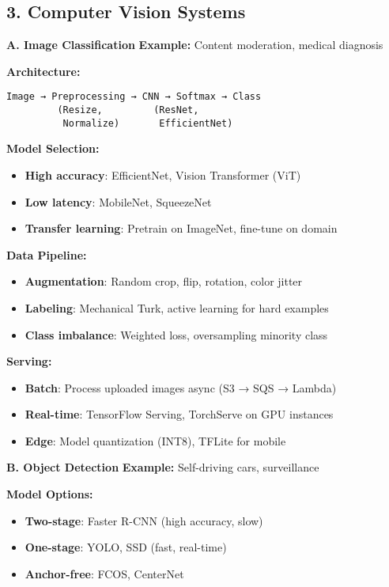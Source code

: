\documentclass[8pt,landscape]{article}
\begin{document}
\begin{multicols}{3}
\subsection*{3. Computer Vision Systems}

\textbf{A. Image Classification}
\textbf{Example:} Content moderation, medical diagnosis

\textbf{Architecture:}
\begin{verbatim}
Image → Preprocessing → CNN → Softmax → Class
         (Resize,         (ResNet,
          Normalize)       EfficientNet)
\end{verbatim}

\textbf{Model Selection:}
\begin{itemize}
\item \textbf{High accuracy}: EfficientNet, Vision Transformer (ViT)
\item \textbf{Low latency}: MobileNet, SqueezeNet
\item \textbf{Transfer learning}: Pretrain on ImageNet, fine-tune on domain
\end{itemize}

\textbf{Data Pipeline:}
\begin{itemize}
\item \textbf{Augmentation}: Random crop, flip, rotation, color jitter
\item \textbf{Labeling}: Mechanical Turk, active learning for hard examples
\item \textbf{Class imbalance}: Weighted loss, oversampling minority class
\end{itemize}

\textbf{Serving:}
\begin{itemize}
\item \textbf{Batch}: Process uploaded images async (S3 → SQS → Lambda)
\item \textbf{Real-time}: TensorFlow Serving, TorchServe on GPU instances
\item \textbf{Edge}: Model quantization (INT8), TFLite for mobile
\end{itemize}

\textbf{B. Object Detection}
\textbf{Example:} Self-driving cars, surveillance

\textbf{Model Options:}
\begin{itemize}
\item \textbf{Two-stage}: Faster R-CNN (high accuracy, slow)
\item \textbf{One-stage}: YOLO, SSD (fast, real-time)
\item \textbf{Anchor-free}: FCOS, CenterNet
\end{itemize}


\end{multicols}
\end{document}
